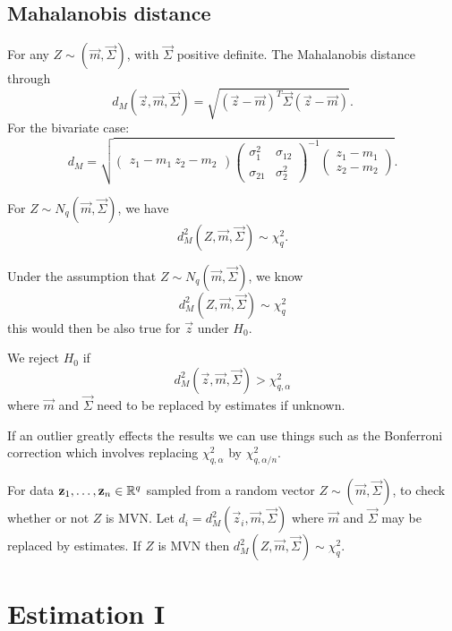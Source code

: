 \documentclass[10pt, a4paper]{article}
\begin{document}
\subsection{Mahalanobis distance}

\begin{definition}
    For any $Z \sim (\vec{m}, \vec{\Sigma})$,
    with $\vec{\Sigma}$ positive definite.
    The Mahalanobis distance through
    \[
    d_M(\vec{z}, \vec{m}, \vec{\Sigma}) = \sqrt{(\vec{z} - \vec{m}) ^ T\vec{\Sigma}(\vec{z} - \vec{m})}.
    \]
    For the bivariate case:
    \[
    d_M = \sqrt{\begin{pmatrix}z_1 - m_1\ z_2 - m_2\end{pmatrix}\begin{pmatrix}
        \sigma_1 ^ 2 & \sigma_{12} \\ \sigma_{21} & \sigma_2 ^ 2
    \end{pmatrix} ^ {-1}\begin{pmatrix}
        z_1 - m_1 \\ z_2 - m_2
    \end{pmatrix}}.
    \]
\end{definition}

For $Z \sim N_q(\vec{m}, \vec{\Sigma})$,
we have
\[
d_M ^ 2(Z, \vec{m}, \vec{\Sigma}) \sim \chi_q ^ 2.
\]

Under the assumption that $Z \sim N_q(\vec{m}, \vec{\Sigma})$,
we know
\[
d_M ^ 2(Z, \vec{m}, \vec{\Sigma}) \sim \chi_q ^ 2
\]
this would then be also true for $\vec{z}$ under $H_0$.

We reject $H_0$ if
\[
d_{M}^{2}(\vec{z}, \vec{m}, \vec{\Sigma}) > \chi_{q, \alpha}^{2}
\]
where $\vec{m}$ and $\vec{\Sigma}$ need to be replaced by estimates if unknown.

If an outlier greatly effects the results we can use things such as the Bonferroni correction which involves replacing $\chi_{q, \alpha}^{2}$ by $\chi_{q, \alpha / n}^{2}$.

For data $\mathbf{z}_1, \dotsc, \mathbf{z}_n \in \mathbb{R} ^ q$ sampled from a random vector $Z \sim (\vec{m}, \vec{\Sigma})$,
to check whether or not $Z$ is MVN.
Let $d_i = d_{M}^{2}(\vec{z}_i, \vec{m}, \vec{\Sigma})$ where $\vec{m}$ and $\vec{\Sigma}$ may be replaced by estimates.
If $Z$ is MVN then $d_{M}^{2}(Z, \vec{m}, \vec{\Sigma}) \sim \chi_{q}^{2}$.

\newpage

\section{Estimation I}
\end{document}
